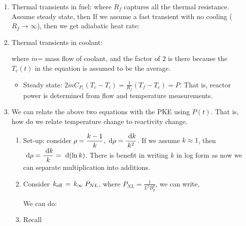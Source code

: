 \documentclass{school-22.211-notes}
\begin{document}
\begin{enumerate}
\item Thermal transients in fuel:  where $R_f$ captures all
  the thermal resistance. Assume steady state, then  If we assume a fast transient
  with no cooling ($R_f \to \infty$), then we get adiabatic heat rate:


\item Thermal transients in coolant: 


where $\dot{m}$= mass flow of coolant, and the factor of $2$ is there
because the $T_c(t)$ in the equation is assumed to be the average.
  \begin{itemize}
    \item Steady state: $\displaystyle 2 \dot{m} C_{P_c} (T_c - T_i) =
      \frac{1}{R_f} (T_f - T_c) = P$. That is, reactor power is
      determined from flow and temperature measurements.
  \end{itemize}


\item We can relate the above two equations with the PKE using
  $P(t)$. That is, how do we relate temperature change to reactivity
  change.
 
  \begin{enumerate}

    \item Set-up: consider $\displaystyle \rho = \frac{k-1}{k}, \mbox{ }\mathrm{d} \rho
      = \frac{\mbox{ }\mathrm{d} k}{k^2}$. If we assume $k \approx 1$, then
      $\displaystyle \mbox{ }\mathrm{d} \rho = \frac{\mbox{ }\mathrm{d} k}{k} = \mbox{ }\mathrm{d}(\ln
      k)$. There is benefit in writing $k$ in log form as now we can
      separate multiplication into additions.

  \item Consider $\left. k_{\mathrm{eff}} \right. = \left. k_{\infty} \right. P_{NL}$, where $P_{NL} = \frac{1}{L^2
    B_g^2}$, we can write, 

     We can do:

  \item Recall
 

\end{enumerate}
\end{enumerate}
\end{document}
